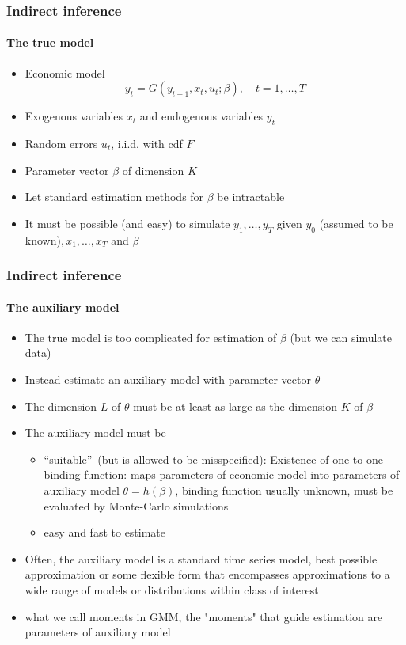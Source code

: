 \documentclass{beamer}
\begin{document}
\begin{frame}\frametitle{Indirect inference}\framesubtitle{The true model}
\begin{itemize}
    \item Economic model
    \begin{equation*}
    y_{t}=G\left( y_{t-1},x_{t},u_{t};\beta \right) ,\quad t=1,\ldots ,T
    \end{equation*}
    \item Exogenous variables $x_{t}$ and endogenous variables $y_{t}$
    \item Random errors $u_{t}$, i.i.d. with cdf $F$
    \item Parameter vector $\beta $ of dimension $K$
    \item Let standard estimation methods for $\beta $ be intractable
    \item It must be possible (and easy) to simulate $y_{1},\ldots ,y_{T}$ given $y_{0}$ (assumed to be known)$,x_{1},\ldots ,x_{T}$ and $\beta $
\end{itemize}
\end{frame}


\begin{frame}\frametitle{Indirect inference}\framesubtitle{The auxiliary model}
\begin{itemize}
    \item The true model is too complicated for estimation of $\beta $ (but we can simulate data)
    \item Instead estimate an auxiliary model with parameter vector $\theta $
    \item The dimension $L$ of $\theta $ must be at least as large as the dimension $K$ of $\beta $
    \item The auxiliary model must be
    \begin{itemize}
    \item \textquotedblleft suitable\textquotedblright\ (but is allowed to be misspecified): Existence of one-to-one- binding function: maps parameters of economic model into parameters of auxiliary model $\theta=h(\beta)$, binding function usually unknown, must be evaluated by Monte-Carlo simulations
    \item easy and fast to estimate
    \end{itemize}
    \item Often, the auxiliary model is a standard time series model, best possible approximation or some flexible form that encompasses approximations to a wide range of models or distributions within class of interest
    \item what we call moments in GMM, the "moments" that guide estimation are parameters of auxiliary model
\end{itemize}
\end{frame}
\end{document}
